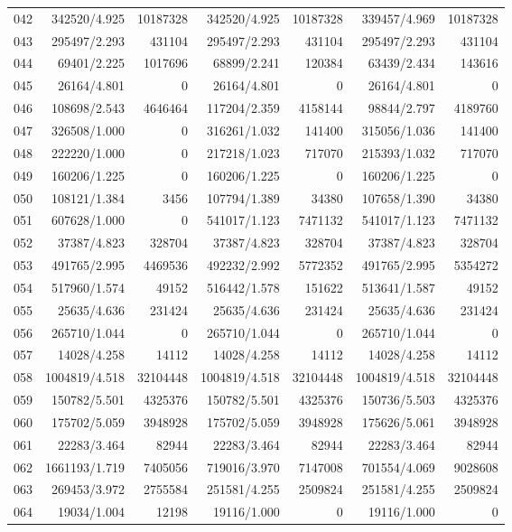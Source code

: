 \begin{longtable}{crrrrrr}
042 & 342520/4.925 & 10187328 & 342520/4.925 & 10187328 & 339457/4.969 & 10187328 \\
043 & 295497/2.293 & 431104 & 295497/2.293 & 431104 & 295497/2.293 & 431104 \\
044 & 69401/2.225 & 1017696 & 68899/2.241 & 120384 & 63439/2.434 & 143616 \\
045 & 26164/4.801 & 0 & 26164/4.801 & 0 & 26164/4.801 & 0 \\
046 & 108698/2.543 & 4646464 & 117204/2.359 & 4158144 & 98844/2.797 & 4189760 \\
047 & 326508/1.000 & 0 & 316261/1.032 & 141400 & 315056/1.036 & 141400 \\
048 & 222220/1.000 & 0 & 217218/1.023 & 717070 & 215393/1.032 & 717070 \\
049 & 160206/1.225 & 0 & 160206/1.225 & 0 & 160206/1.225 & 0 \\
050 & 108121/1.384 & 3456 & 107794/1.389 & 34380 & 107658/1.390 & 34380 \\
051 & 607628/1.000 & 0 & 541017/1.123 & 7471132 & 541017/1.123 & 7471132 \\
052 & 37387/4.823 & 328704 & 37387/4.823 & 328704 & 37387/4.823 & 328704 \\
053 & 491765/2.995 & 4469536 & 492232/2.992 & 5772352 & 491765/2.995 & 5354272 \\
054 & 517960/1.574 & 49152 & 516442/1.578 & 151622 & 513641/1.587 & 49152 \\
055 & 25635/4.636 & 231424 & 25635/4.636 & 231424 & 25635/4.636 & 231424 \\
056 & 265710/1.044 & 0 & 265710/1.044 & 0 & 265710/1.044 & 0 \\
057 & 14028/4.258 & 14112 & 14028/4.258 & 14112 & 14028/4.258 & 14112 \\
058 & 1004819/4.518 & 32104448 & 1004819/4.518 & 32104448 & 1004819/4.518 & 32104448 \\
059 & 150782/5.501 & 4325376 & 150782/5.501 & 4325376 & 150736/5.503 & 4325376 \\
060 & 175702/5.059 & 3948928 & 175702/5.059 & 3948928 & 175626/5.061 & 3948928 \\
061 & 22283/3.464 & 82944 & 22283/3.464 & 82944 & 22283/3.464 & 82944 \\
062 & 1661193/1.719 & 7405056 & 719016/3.970 & 7147008 & 701554/4.069 & 9028608 \\
063 & 269453/3.972 & 2755584 & 251581/4.255 & 2509824 & 251581/4.255 & 2509824 \\
064 & 19034/1.004 & 12198 & 19116/1.000 & 0 & 19116/1.000 & 0 \\

\end{longtable}
